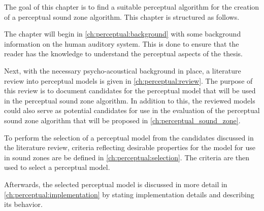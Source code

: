 
The goal of this chapter is to find a suitable perceptual algorithm for the creation of a perceptual sound zone algorithm.
This chapter is structured as follows.

The chapter will begin in \autoref{ch:perceptual:background} with some background information on the human auditory system.
This is done to ensure that the reader has the knowledge to understand the perceptual aspects of the thesis.

Next, with the necessary psycho-acoustical background in place, a literature review into perceptual models is given in \autoref{ch:perceptual:review}.
The purpose of this review is to document candidates for the perceptual model that will be used in the perceptual sound zone algorithm.
In addition to this, the reviewed models could also serve as potential candidates for use in the evaluation 
of the perceptual sound zone algorithm that will be proposed in \autoref{ch:perceptual_sound_zone}.

To perform the selection of a perceptual model from the candidates discussed in the literature review, 
criteria reflecting desirable properties for the model for use in sound zones are be defined in \autoref{ch:perceptual:selection}. 
The criteria are then used to select a perceptual model.

Afterwards, the selected perceptual model is discussed in more detail in \autoref{ch:perceptual:implementation} by stating implementation 
details and describing its behavior.
